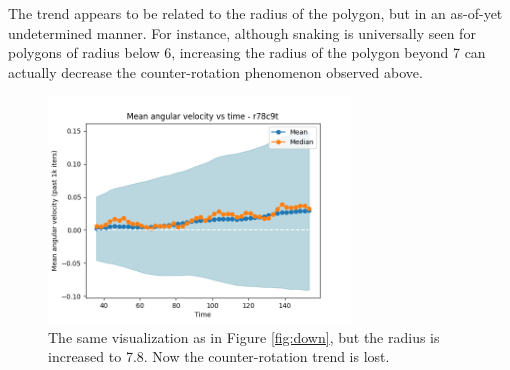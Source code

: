 \documentclass{article}
\begin{document}
The trend appears to be related to the radius of the polygon, but in an as-of-yet undetermined manner. For instance, although snaking is universally seen for polygons of radius below 6, increasing the radius of the polygon beyond 7 can actually decrease the counter-rotation phenomenon observed above. 
\begin{figure}
    \centering
\includegraphics[height=6cm]{up.png}
  \caption{The same visualization as in Figure \ref{fig:down}, but the radius is increased to 7.8. Now the counter-rotation trend is lost. }
    \label{fig:up}
\end{figure}
\end{document}
